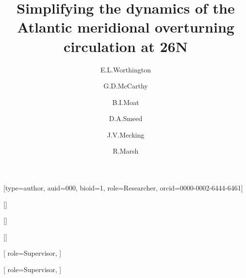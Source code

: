 \documentclass[a4paper,fleqn]{cas-sc}
\begin{document}
\let\WriteBookmarks\relax
\def\floatpagepagefraction{1}
\def\textpagefraction{.001}
\shorttitle{}

\title [mode = title]{Simplifying the dynamics of the Atlantic meridional overturning circulation at 26\textdegree N}                      
\tnotemark[1]


\author[1]{E.L.Worthington}[type=author,
                        auid=000, bioid=1,
                        role=Researcher,
                        orcid=0000-0002-6444-6461]
\cormark[1]
\fnmark[1]


\author[2]{G.D.McCarthy}[]

\author[3]{B.I.Moat}[]

\author[3]{D.A.Smeed}[]

\author[3]{J.V.Mecking}[%
   role=Supervisor,
   ]
   
\author[1]{R.Marsh}[%
   role=Supervisor,
   ]


\address[1]{University of Southampton, European Way, Southampton, SO14 3ZH, UK}
\address[2]{ICARUS, Maynooth University, Maynooth, Co. Kildare, Ireland}
\address[3]{National Oceanography Centre, European Way, Southampton, SO14 3ZH, UK}


\end{document}
